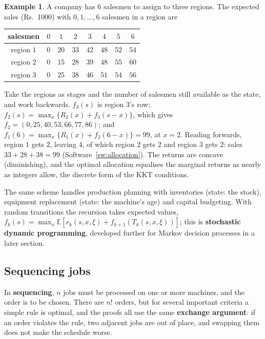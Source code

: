 \documentclass[11pt,a4paper]{article}
\numberwithin{equation}{section}
\theoremstyle{definition}
\newtheorem{exa}[thm]{Example}
\begin{document}
\begin{exa}
\label{ex:allocation}
A company has $6$ salesmen to assign to three regions. The expected sales (Rs.~1000) with $0, 1, \ldots, 6$ salesmen in a region are
\begin{center}
\small
\begin{tabular}{c|ccccccc}
salesmen & $0$ & $1$ & $2$ & $3$ & $4$ & $5$ & $6$ \\
\hline
region $1$ & $0$ & $20$ & $33$ & $42$ & $48$ & $52$ & $54$ \\
region $2$ & $0$ & $15$ & $28$ & $39$ & $48$ & $55$ & $60$ \\
region $3$ & $0$ & $25$ & $38$ & $46$ & $51$ & $54$ & $56$
\end{tabular}
\end{center}
Take the regions as stages and the number of salesmen still available as the state, and work backwards. $f_3(s)$ is region $3$'s row; $f_2(s) = \max_x\{R_2(x) + f_3(s - x)\}$, which gives $f_2 = (0, 25, 40, 53, 66, 77, 86)$; and $f_1(6) = \max_x\{R_1(x) + f_2(6 - x)\} = 99$, at $x = 2$. Reading forwards,
region $1$ gets $2$, leaving $4$, of which region $2$ gets $2$ and region $3$ gets $2$: sales $33 + 28 + 38 = 99$ (Software~\ref{sw:allocation}). The returns are concave (diminishing), and the optimal allocation equalises the marginal returns as nearly as integers allow, the discrete form of the KKT conditions.
\end{exa}

The same scheme handles production planning with inventories (state: the stock), equipment replacement (state: the machine's age) and capital budgeting. With random transitions the recursion takes expected values, $f_k(s) = \max_x\mathbb E[r_k(s, x, \xi) + f_{k + 1}(T_k(s, x, \xi))]$; this is \textbf{stochastic dynamic programming}, developed further for Markov
decision processes in a later section.

\subsection{Sequencing jobs}
\label{ssec:sequencing}

In \textbf{sequencing}, $n$ jobs must be processed on one or more machines, and the order is to be chosen. There are $n!$ orders, but for several important criteria a simple rule is optimal, and the proofs all use the same \textbf{exchange argument}: if an order violates the rule, two adjacent jobs are out of place, and swapping them does not make the
schedule worse.
\end{document}
